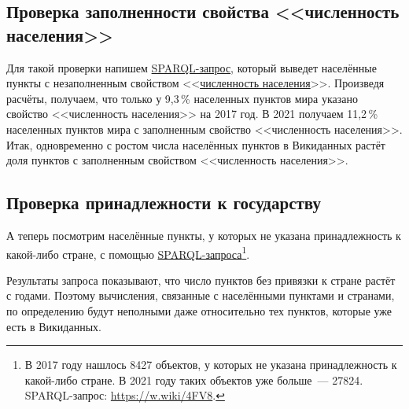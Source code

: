 \subsection{Проверка заполненности свойства <<численность населения>> }

Для такой проверки напишем \href{https://w.wiki/4FUz}{SPARQL-запрос}, 
который выведет населённые пункты 
с незаполненным свойством <<\href{http://www.wikidata.org/entity/P1082}{численность населения}>>. 
Произведя расчёты, получаем, что только у 9,3\,\% населенных пунктов мира 
указано свойство <<численность населения>> на 2017 год. 
В 2021 получаем 11,2\,\% населенных пунктов мира с заполненным свойство <<численность населения>>. 
Итак, одновременно с ростом числа населённых пунктов в Викиданных 
растёт доля пунктов с заполненным свойством <<численность населения>>.


\subsection{Проверка принадлежности к государству}

А теперь посмотрим населённые пункты, 
у которых не указана принадлежность к какой-либо стране, 
с помощью \href{https://w.wiki/4FV8}{SPARQL-запроса}\footnote{%
%
    В 2017 году нашлось \num{8427} объектов, у которых не указана принадлежность к какой-либо стране. 
    В 2021 году таких объектов уже больше~--- \num{27824}.\newline
    SPARQL-запрос: \href{https://w.wiki/4FV8}{https://w.wiki/4FV8}.%
}. 

Результаты запроса показывают, что число пунктов без привязки к стране растёт с годами. 
Поэтому вычисления, связанные с населёнными пунктами и странами, 
по определению будут неполными даже относительно тех пунктов, которые уже есть в Викиданных. 


\marginnote{%
    \MarginQuestion Герб населённого пункта какой страны изображён?

    \texttt{[image: ./chapter/human\_settlement/Loučovice\_CoA.jpg]}

    См. ответ~\ref{answer:flag_human_settlements} на с.~\pageref{answer:flag_human_settlements}.%
}%

